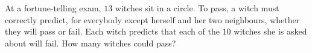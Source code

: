 At a fortune-telling exam, $13$ witches sit in a circle. To pass, a witch must correctly predict, for everybody except herself and her two neighbours, whether they will pass or fail. Each witch predicts that each of the $10$ witches she is asked about will fail. How many witches could pass?
